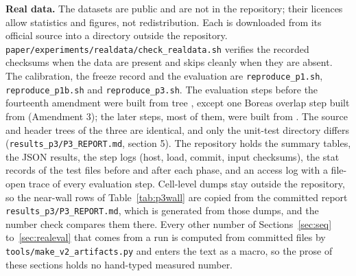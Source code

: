 \noindent\textbf{Real data.} The datasets are public and are not in the repository; their licences allow statistics and figures, not redistribution. Each is downloaded from its official source into a directory outside the repository. \nolinkurl{paper/experiments/realdata/check_realdata.sh} verifies the recorded checksums when the data are present and skips cleanly when they are absent. The calibration, the freeze record and the evaluation are \nolinkurl{reproduce_p1.sh}, \nolinkurl{reproduce_p1b.sh} and \nolinkurl{reproduce_p3.sh}. The evaluation steps before the fourteenth amendment were built from  tree , except one Boreas overlap step built from  (Amendment 3); the later steps, most of them, were built from . The source and header trees of the three are identical, and only the unit-test directory differs (\nolinkurl{results_p3/P3_REPORT.md}, section 5). The repository holds the summary tables, the JSON results, the step logs (host, load, commit, input checksums), the stat records of the test files before and after each phase, and an access log with a file-open trace of every evaluation step. Cell-level dumps stay outside the repository, so the near-wall rows of Table~\ref{tab:p3wall} are copied from the committed report \nolinkurl{results_p3/P3_REPORT.md}, which is generated from those dumps, and the number check compares them there. Every other number of Sections~\ref{sec:seq} to~\ref{sec:realeval} that comes from a run is computed from committed files by \nolinkurl{tools/make_v2_artifacts.py} and enters the text as a macro, so the prose of these sections holds no hand-typed measured number.

